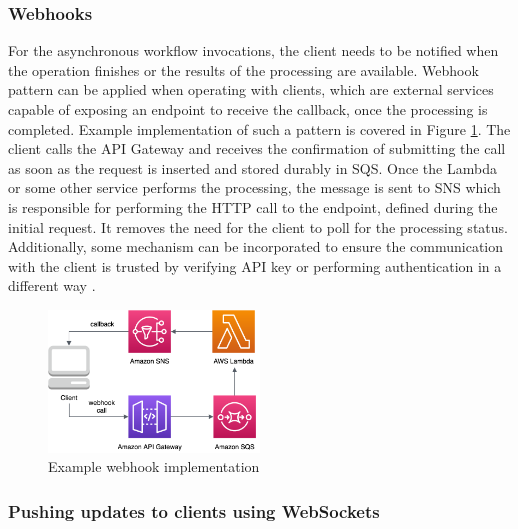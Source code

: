 \subsubsection{Webhooks} \label{chapter:client-webhooks}

For the asynchronous workflow invocations, the client needs to be notified when the operation finishes or the results of the processing are available.
Webhook pattern can be applied when operating with clients, which are external services capable of exposing an endpoint to receive the callback, once the processing is completed.
Example implementation of such a pattern is covered in Figure \ref{fig:pattern-webhook}.
The client calls the API Gateway and receives the confirmation of submitting the call as soon as the request is inserted and stored durably in SQS.
Once the Lambda or some other service performs the processing, the message is sent to SNS which is responsible for performing the HTTP call to the endpoint, defined during the initial request.
It removes the need for the client to poll for the processing status.
Additionally, some mechanism can be incorporated to ensure the communication with the client is trusted by verifying API key or performing authentication in a different way \cite{ServerlessAtScaleDesignPatternsAndOptimizations}.

\begin{figure}[H]
   \centering
   \includegraphics[width=0.5\textwidth]{assets/04-serverless-for-web-apps/webhook.png}
   \caption{Example webhook implementation}
   \label{fig:pattern-webhook}
\end{figure}

\subsubsection{Pushing updates to clients using WebSockets} \label{chapter:client-websockets}

